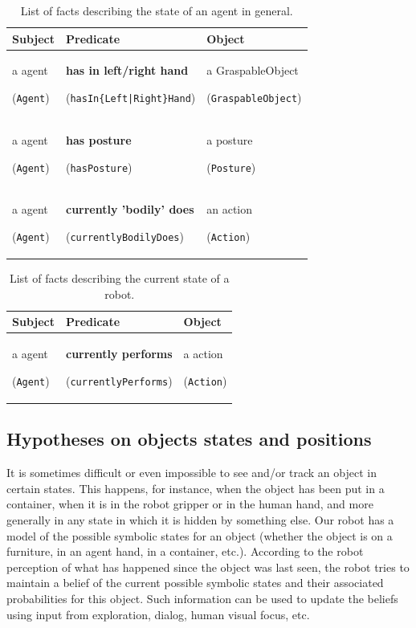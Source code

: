 \documentclass{svmult}
\newcommand{\concept}[1]{{\footnotesize \texttt{#1}}}
\begin{document}
\begin{table}[h]
	\centering
	\begin{tabular}{p{2cm}p{5cm}p{2cm}}
		\textbf{Subject} & \textbf{Predicate} & \textbf{Object} \\
		\hline
		a agent \par (\concept{Agent})  & \textbf{has in left/right hand} \par (\concept{hasIn\{Left|Right\}Hand})  &  a GraspableObject \par (\concept{GraspableObject}) \\ 
		a agent \par (\concept{Agent})  & \textbf{has posture} \par (\concept{hasPosture})  &  a posture \par (\concept{Posture})  \\
		a agent \par (\concept{Agent})  & \textbf{currently 'bodily' does} \par (\concept{currentlyBodilyDoes})  &  an action \par (\concept{Action})
	\end{tabular}
	\caption{List of facts describing the state of an agent in general.}
\end{table}

\begin{table}[h]
	\centering
	\begin{tabular}{p{2cm}p{5cm}p{2cm}}
		\textbf{Subject} & \textbf{Predicate} & \textbf{Object} \\
		\hline
		a agent \par (\concept{Agent})  & \textbf{currently performs} \par (\concept{currentlyPerforms})  &  a action \par (\concept{Action})
	\end{tabular}
	\caption{List of facts describing the current state of a robot.}
\end{table}

\subsection{Hypotheses on objects states and positions}

It is sometimes difficult or even impossible to see and/or track an object in
certain states. This happens, for instance, when the object has been put in a
container, when it is in the robot gripper or in the human hand, and more
generally in any state in which it is hidden by something else. Our robot has a
model of the possible symbolic states for an object (whether the object is on a
furniture, in an agent hand, in a container, etc.).  According to the robot
perception of what has happened since the object was last seen, the robot tries
to maintain a belief of the current possible symbolic states and their
associated probabilities for this object. Such information can be used to
update the beliefs using input from exploration, dialog, human visual focus,
etc.
\end{document}
